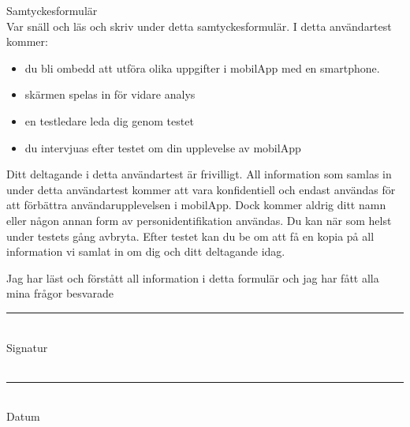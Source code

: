 \documentclass[a4paper,12pt]{article} %
\newcommand{\Qline}[1]{\noindent\rule{#1}{0.6pt}}
\begin{document}
{\LARGE Samtyckesformulär}\\ [.5cm]

Var snäll och läs och skriv under detta samtyckesformulär. I detta användartest kommer:
\begin{itemize}[noitemsep]
  \item du bli ombedd att utföra olika uppgifter i mobilApp med en smartphone.
  \item skärmen spelas in för vidare analys
  \item en testledare leda dig genom testet
  \item du intervjuas efter testet om din upplevelse av mobilApp
\end{itemize}

Ditt deltagande i detta användartest är frivilligt. All information som samlas in under detta användartest kommer att vara konfidentiell och endast användas för att förbättra användarupplevelsen i mobilApp. Dock kommer aldrig ditt namn eller någon annan form av personidentifikation användas. Du kan när som helst under testets gång avbryta. Efter testet kan du be om att få en kopia på all information vi samlat in om dig och ditt deltagande idag.

Jag har läst och förstått all information i detta formulär och jag har fått alla mina frågor besvarade
\vspace{1cm} %
\\

\Qline{0.7\textwidth}\\
Signatur\\
\vspace{1cm} %
\\
\Qline{0.7\textwidth}\\
Datum
\end{document}
